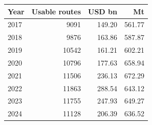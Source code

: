 \begin{tabular}{lrrr}
\toprule
Year & Usable routes & USD bn & Mt \\
\midrule
2017 & 9091 & 149.20 & 561.77 \\
2018 & 9876 & 163.86 & 587.87 \\
2019 & 10542 & 161.21 & 602.21 \\
2020 & 10796 & 177.63 & 658.94 \\
2021 & 11506 & 236.13 & 672.29 \\
2022 & 11863 & 288.54 & 643.12 \\
2023 & 11755 & 247.93 & 649.27 \\
2024 & 11128 & 206.39 & 636.52 \\
\bottomrule
\end{tabular}

